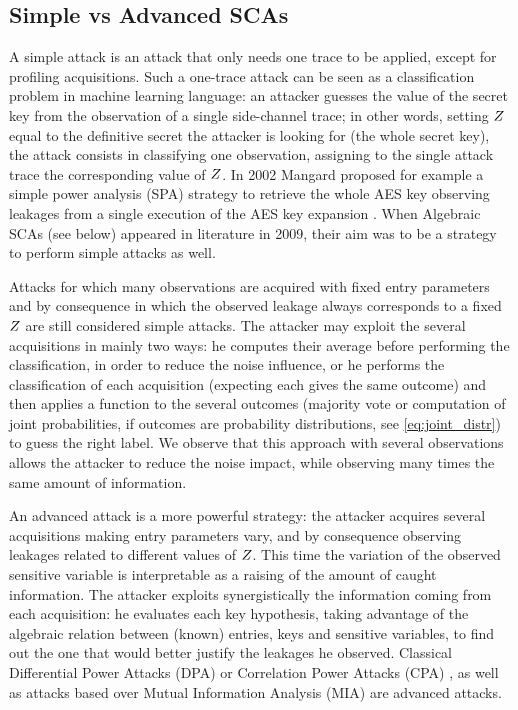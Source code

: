 \subsection{Simple vs Advanced SCAs}
A simple attack is an attack that only needs one trace to be applied, except for profiling acquisitions. Such a one-trace attack can be seen as a classification problem in machine learning language: an attacker guesses the value of the secret key from the observation of a single side-channel trace;  in other words, setting $Z$ equal to the definitive secret the attacker is looking for (\eg the whole secret key), the attack consists in classifying one observation, \ie assigning to the single attack trace the corresponding value of $Z$. In 2002 Mangard \etal proposed for example a simple power analysis (SPA) strategy to retrieve the whole AES key observing leakages from a single execution of the AES key expansion \cite{mangard2002simple}. When Algebraic SCAs (see below) appeared in literature in 2009, their aim was to be a strategy to perform simple attacks as well.  

\begin{remark}
Attacks for which many observations are acquired with fixed entry parameters and by consequence in which the observed leakage always corresponds to a fixed $Z$ are still considered simple attacks. The attacker may exploit the several acquisitions in mainly two ways: he computes their average before performing the classification, in order to reduce the noise influence, or he performs the classification of each acquisition (expecting each gives the same outcome) and then applies a function to the several outcomes (\eg majority vote or computation of joint probabilities, if outcomes are probability distributions, see \ref{eq:joint_distr}) to guess the right label. We observe that this approach with several observations allows the attacker to reduce the noise impact, while observing many times the same amount of information.
\end{remark}
An advanced attack is a more powerful strategy: the attacker acquires several acquisitions making entry parameters vary, and by consequence observing leakages related to different values of $Z$. This time the variation of the observed sensitive variable is interpretable as a raising of the amount of caught information. The attacker exploits synergistically the information coming from each acquisition: he evaluates each key hypothesis, taking advantage of the algebraic relation between (known) entries, keys and sensitive variables, to find out the one that would better justify the leakages he observed. Classical Differential Power Attacks (DPA) \cite{brier2004correlation} or Correlation Power Attacks (CPA) \cite{brier2004correlation}, as well as attacks based over Mutual Information Analysis (MIA) \cite{batina2011mutual} are advanced attacks. 


